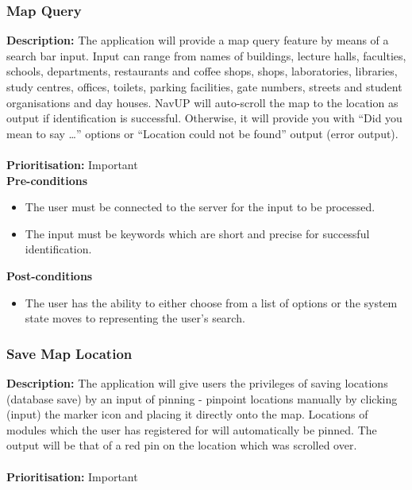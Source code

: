 \documentclass[runningheads,a4paper]{article}
\begin{document}
\subsubsection{Map Query}

\textbf{Description:}  The application will provide a map query feature by means of a search bar input. Input can range from names of buildings, lecture halls, faculties, schools, departments, restaurants and coffee shops, shops, laboratories, libraries, study centres, offices, toilets,  parking facilities, gate numbers, streets and student organisations and day houses. NavUP will auto-scroll the map to the location as output if identification is successful. Otherwise, it will provide you with “Did you mean to say …” options or “Location could not be found” output (error output).\\\\
\noindent
\textbf{Prioritisation:} Important\\
  
  
\textbf{Pre-conditions}
\begin{itemize}
 	\item The user must be connected to the server for the input to be processed.
	\item The input must be keywords which are short and precise for successful identification.
\end{itemize}
  
\textbf{Post-conditions}
\begin{itemize}
  	\item The user has the ability to either choose from a list of options or the system state moves to representing the user's search.
\end{itemize}

\subsubsection{Save Map Location}

\textbf{Description:}  The application will give users the privileges of saving locations (database save) by an input of pinning - pinpoint locations manually by clicking (input) the marker icon and placing it directly onto the map. Locations of modules which the user has registered for will automatically be pinned. The output will be that of a red pin on the location which was scrolled over.\\\\
\noindent
\textbf{Prioritisation:} Important\\
  
\end{document}
